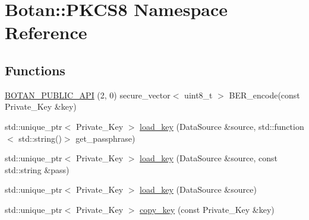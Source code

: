 \hypertarget{namespace_botan_1_1_p_k_c_s8}{}\section{Botan\+:\+:P\+K\+C\+S8 Namespace Reference}
\label{namespace_botan_1_1_p_k_c_s8}
\subsection*{Functions}
\begin{DoxyCompactItemize}
\item 
\hyperlink{namespace_botan_1_1_p_k_c_s8_a1a8abd3b8ed274b93110ebebefcb0eb6}{B\+O\+T\+A\+N\+\_\+\+P\+U\+B\+L\+I\+C\+\_\+\+A\+PI} (2, 0) secure\+\_\+vector$<$ uint8\+\_\+t $>$ B\+E\+R\+\_\+encode(const Private\+\_\+\+Key \&key)
\item 
std\+::unique\+\_\+ptr$<$ Private\+\_\+\+Key $>$ \hyperlink{namespace_botan_1_1_p_k_c_s8_a2eb85270cb50784297d53959fca2dac6}{load\+\_\+key} (Data\+Source \&source, std\+::function$<$ std\+::string()$>$ get\+\_\+passphrase)
\item 
std\+::unique\+\_\+ptr$<$ Private\+\_\+\+Key $>$ \hyperlink{namespace_botan_1_1_p_k_c_s8_aeee3a469770fe03a5b95b0fbe0423b41}{load\+\_\+key} (Data\+Source \&source, const std\+::string \&pass)
\item 
std\+::unique\+\_\+ptr$<$ Private\+\_\+\+Key $>$ \hyperlink{namespace_botan_1_1_p_k_c_s8_a0443f2ec21f8c932faff623dda025872}{load\+\_\+key} (Data\+Source \&source)
\item 
std\+::unique\+\_\+ptr$<$ Private\+\_\+\+Key $>$ \hyperlink{namespace_botan_1_1_p_k_c_s8_aeef272ce9e8379d8843f5f3f26431449}{copy\+\_\+key} (const Private\+\_\+\+Key \&key)
\end{DoxyCompactItemize}
